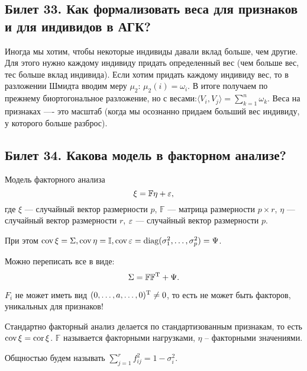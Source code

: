 \subsection{Билет 33. Как формализовать веса для признаков и для индивидов в АГК?}
Иногда мы хотим, чтобы некоторые индивиды давали вклад больше, чем другие. Для этого нужно каждому индивиду придать определенный вес (чем больше вес, тес больше вклад индивида). 
Если хотим придать каждому индивиду вес, то в разложении Шмидта вводим меру $\mu_2$: $\mu_2({i})=\omega_i$. В итоге получаем по прежнему биортогональное разложение, но с весами:$\langle V_i,V_j \rangle =\sum_{k=1} ^n \omega_k$. 
Веса на признаках —- это масштаб (когда мы осознанно придаем больший вес индивиду, у которого больше разброс).

\subsection{Билет 34. Какова модель в факторном анализе?}
Модель факторного анализа
\begin{equation*}
\xi = \mathbb{F}\eta + \varepsilon, 
\end{equation*}
где $\xi$ --- случайный вектор размерности $p$,
$\mathbb{F}$ --- матрица размерности $p \times r$, 
$\eta$ ---случайный вектор размерности $r$, $\varepsilon$ --- случайный вектор размерности $p$. 

При этом $\operatorname{cov} \xi = \Sigma, \operatorname{cov} \eta = \mathbb{I}, \operatorname{cov} \varepsilon = \operatorname{diag}(\sigma^2_1, \ldots, \sigma^2_p) = \Psi$.

Можно переписать все в виде:
\begin{equation*}
\Sigma = \mathbb{F}\mathbb{F}^{\operatorname*{T}} + \Psi.
\end{equation*}
\begin{note}
$F_i$ не может иметь вид $(0, \ldots, a, \ldots, 0)^{\operatorname*{T}} \ne  0$, то есть не может быть факторов, уникальных для признаков!
\end{note}

Стандартно факторный анализ делается по стандартизованным признакам, то есть $\operatorname{cov} \xi = \operatorname{cor} \xi$.
$\mathbb{F}$ называется факторными нагрузками, $\eta$ -- факторными значениями.

Общностью будем называть $\sum\limits_{j = 1}^{r} f^2_{ij} = 1 - \sigma^2_i$.

